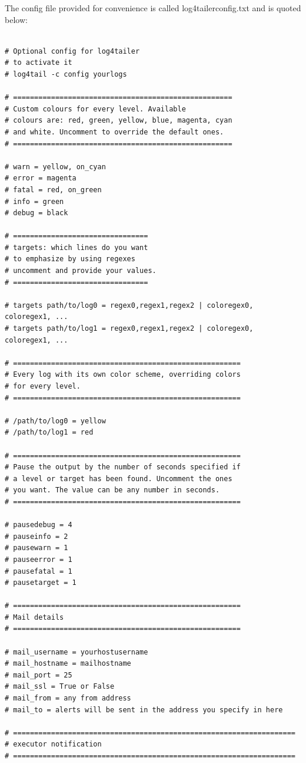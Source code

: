 The config file provided for convenience is called log4tailerconfig.txt and is quoted below:

\begin{verbatim}

# Optional config for log4tailer
# to activate it
# log4tail -c config yourlogs

# ====================================================
# Custom colours for every level. Available 
# colours are: red, green, yellow, blue, magenta, cyan 
# and white. Uncomment to override the default ones.
# ====================================================

# warn = yellow, on_cyan
# error = magenta 
# fatal = red, on_green
# info = green
# debug = black

# ================================
# targets: which lines do you want 
# to emphasize by using regexes
# uncomment and provide your values.
# ================================

# targets path/to/log0 = regex0,regex1,regex2 | coloregex0, coloregex1, ...
# targets path/to/log1 = regex0,regex1,regex2 | coloregex0, coloregex1, ...

# ======================================================
# Every log with its own color scheme, overriding colors 
# for every level.
# ======================================================

# /path/to/log0 = yellow
# /path/to/log1 = red

# ======================================================
# Pause the output by the number of seconds specified if 
# a level or target has been found. Uncomment the ones 
# you want. The value can be any number in seconds. 
# ======================================================

# pausedebug = 4
# pauseinfo = 2
# pausewarn = 1
# pauseerror = 1
# pausefatal = 1
# pausetarget = 1

# ======================================================
# Mail details 
# ======================================================

# mail_username = yourhostusername
# mail_hostname = mailhostname
# mail_port = 25
# mail_ssl = True or False
# mail_from = any from address
# mail_to = alerts will be sent in the address you specify in here

# ===================================================================
# executor notification
# ===================================================================


\end{verbatim}
